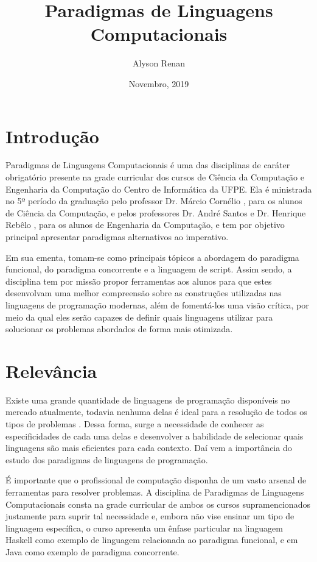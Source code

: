 \documentclass[10pt]{article}
\title{Paradigmas de Linguagens Computacionais}
\author{Alyson Renan}
\date{Novembro, 2019}
\begin{document}
\maketitle

\section{Introdução}
\justify
Paradigmas de Linguagens Computacionais é uma das disciplinas de caráter obrigatório presente na grade curricular dos cursos de Ciência da Computação\cite{ccClassPage} e Engenharia da Computação\cite{ecClassPage} do Centro de Informática da UFPE. Ela é ministrada no 5º período da graduação pelo professor Dr. Márcio Cornélio \cite{cornelioLattes}, para os alunos de Ciência da Computação, e pelos professores Dr. André Santos \cite{santosLattes} e Dr. Henrique Rebêlo \cite{rebeloLattes}, para os alunos de Engenharia da Computação, e tem por objetivo principal apresentar paradigmas alternativos ao imperativo.

\justify
Em sua ementa, tomam-se como principais tópicos a abordagem do paradigma funcional, do paradigma concorrente e a linguagem de script. Assim sendo, a disciplina tem por missão propor ferramentas aos alunos para que estes desenvolvam uma melhor compreensão sobre as construções utilizadas nas linguagens de programação modernas, além de fomentá-los uma visão crítica, por meio da qual eles serão capazes de definir quais linguagens utilizar para solucionar os problemas abordados de forma mais otimizada.

\section{Relevância}
\justify
Existe uma grande quantidade de linguagens de programação disponíveis no mercado atualmente, todavia nenhuma delas é ideal para a resolução de todos os tipos de problemas \cite{castroClass}. Dessa forma, surge a necessidade de conhecer as especificidades de cada uma delas e desenvolver a habilidade de selecionar quais linguagens são mais eficientes para cada contexto. Daí vem a importância do estudo dos paradigmas de linguagens de programação.

\justify
É importante que o profissional de computação disponha de um vasto arsenal de ferramentas para resolver problemas. A disciplina de Paradigmas de Linguagens Computacionais consta na grade curricular de ambos os cursos supramencionados justamente para suprir tal necessidade e, embora não vise ensinar um tipo de linguagem específica, o curso apresenta um ênfase particular na linguagem Haskell como exemplo de linguagem relacionada ao paradigma funcional, e em Java como exemplo de paradigma concorrente.
\end{document}
